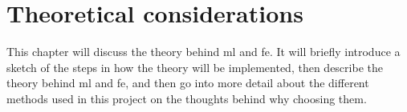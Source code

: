 \chapter{Theoretical considerations}\label{cha:theory}
This chapter will discuss the theory behind \gls{ml} and \gls{fe}. It will briefly introduce a sketch of the steps in how the theory will be implemented, then describe the theory behind \gls{ml} and \gls{fe}, and then go into more detail about the different methods used in this project on the thoughts behind why choosing them.











